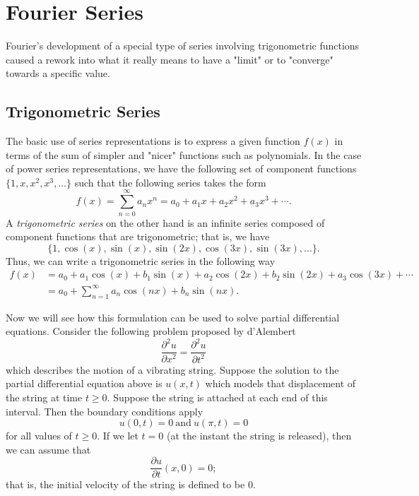 \section{Fourier Series}
Fourier's development of a special type of series involving trigonometric functions caused a rework into what it really means to have a "limit" or to "converge" towards a specific value.

\subsection{Trigonometric Series}

The basic use of series representations is to express a given function \( f(x)  \) in terms of the sum of simpler and "nicer" functions such as polynomials. In the case of power series representations, we have the following set of component functions \( \{ 1, x, x^{2}, x^{3}, \dots \}  \) such that the following series takes the form 
\[  f(x) = \sum_{ n=0  }^{ \infty  } a_{n} x^{n} = a_{0} + a_{1} x + a_{2} x^{2} + a_{3} x^{3} + \dotsb  . \]
A \textit{trigonometric series} on the other hand is an infinite series composed of component functions that are trigonometric; that is, we have 
\[  \{ 1 , \cos(x), \sin(x), \sin(2x), \cos(3x), \sin(3x), \dots \}.  \]
Thus, we can write a trigonometric series in the following way 
\begin{align*}
    f(x) &= a_{0} + a_{1}\cos(x) + b_{1} \sin(x) +  a_{2} \cos(2x) + b_{2} \sin(2x) + a_{3} \cos(3x) + \dotsb  \\
         &= a_{0} + \sum_{ n=1 }^{ \infty  } a_{n} \cos(nx) + b_{n} \sin(nx). 
\end{align*}

Now we will see how this formulation can be used to solve partial differential equations. Consider the following problem proposed by d'Alembert
\[  \frac{\partial ^{2} u  }{\partial x^{2}   } = \frac{\partial ^{2} u  }{\partial t^{2} } \tag{1} \]
which describes the motion of a vibrating string. Suppose the solution to the partial differential equation above is \( u(x,t)  \) which models that displacement of the string at time \( t \geq 0  \). Suppose the string is attached at each end of this interval. Then the boundary conditions apply
\[  u(0,t) = 0 \ \text{and} \ u(\pi, t) = 0  \tag{2} \]
for all values of \( t \geq 0  \). If we let \( t = 0  \) (at the instant the string is released), then we can assume that 
\[  \frac{\partial u }{\partial t } (x,0) = 0; \]
that is, the initial velocity of the string is defined to be \( 0 \). 

